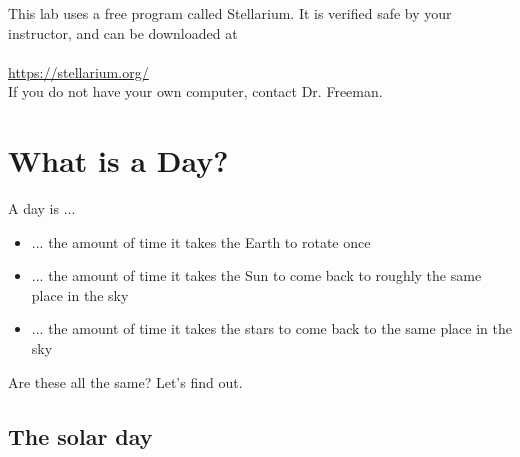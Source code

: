 \documentclass[11pt]{article}
\begin{document}
This lab uses a free program called Stellarium. It is verified safe by your instructor, and can be downloaded at  \\
\\
\url{https://stellarium.org/} \\

If you do not have your own computer, contact Dr. Freeman.

\newpage

\section{What is a Day?}

A day is ...

\begin{itemize}
\item ... the amount of time it takes the Earth to rotate once
\item ... the amount of time it takes the Sun to come back to roughly the same place in the sky
\item ... the amount of time it takes the stars to come back to the same place in the sky
\end{itemize}

	Are these all the same? Let's find out.

\subsection{The solar day}
\end{document}
